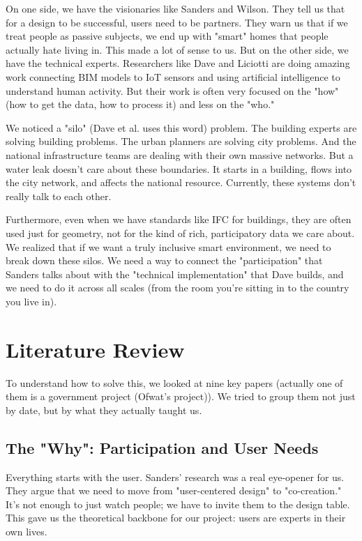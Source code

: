 \documentclass[a4paper,oneside,12pt]{report}
\begin{document}
On one side, we have the visionaries like Sanders\cite{Sanders2008} and Wilson\cite{Wilson2015}. They tell us that for a design to be successful, users need to be partners. They warn us that if we treat people as passive subjects, we end up with "smart" homes that people actually hate living in. This made a lot of sense to us. But on the other side, we have the technical experts. Researchers like Dave\cite{Dave2018} and Liciotti\cite{Liciotti2020} are doing amazing work connecting BIM models to IoT sensors and using artificial intelligence to understand human activity. But their work is often very focused on the "how" (how to get the data, how to process it) and less on the "who."

We noticed a "silo" (Dave et al.\cite{Dave2018} uses this word) problem. The building experts are solving building problems. The urban planners are solving city problems. And the national infrastructure teams are dealing with their own massive networks. But a water leak doesn't care about these boundaries. It starts in a building, flows into the city network, and affects the national resource. Currently, these systems don't really talk to each other.

Furthermore, even when we have standards like IFC for buildings, they are often used just for geometry, not for the kind of rich, participatory data we care about. We realized that if we want a truly inclusive smart environment, we need to break down these silos. We need a way to connect the "participation" that Sanders talks about with the "technical implementation" that Dave builds, and we need to do it across all scales (from the room you're sitting in to the country you live in).

\chapter{Literature Review}

To understand how to solve this, we looked at nine key papers (actually one of them is a government project (Ofwat's project\cite{ThamesWater2024})). We tried to group them not just by date, but by what they actually taught us.

\section{The "Why": Participation and User Needs}
Everything starts with the user. Sanders' research\cite{Sanders2008} was a real eye-opener for us. They argue that we need to move from "user-centered design" to "co-creation." It's not enough to just watch people; we have to invite them to the design table. This gave us the theoretical backbone for our project: users are experts in their own lives.
\end{document}
